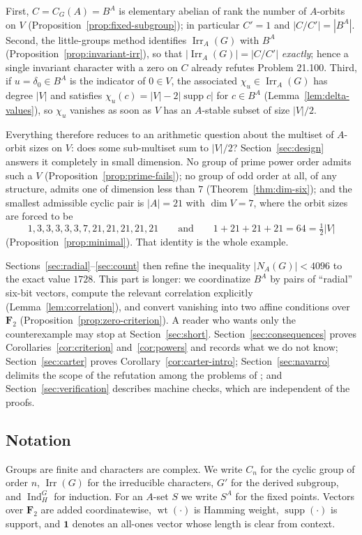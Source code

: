 \documentclass[11pt,a4paper,reqno]{amsart}
\theoremstyle{definition}
\theoremstyle{remark}
\newcommand{\F}{\mathbf F}
\newcommand{\Irr}{\operatorname{Irr}}
\newcommand{\Ind}{\operatorname{Ind}}
\newcommand{\supp}{\operatorname{supp}}
\newcommand{\wt}{\operatorname{wt}}
\newcommand{\one}{\mathbf 1}
\begin{document}
First, $C=C_G(A)=B^A$ is elementary abelian of rank the number of
$A$-orbits on $V$ (Proposition~\ref{prop:fixed-subgroup}); in particular
$C'=1$ and $|C/C'|=|B^A|$.  Second, the little-groups method identifies
$\Irr_A(G)$ with $B^A$ (Proposition~\ref{prop:invariant-irr}), so that
$|\Irr_A(G)|=|C/C'|$ \emph{exactly}; hence a single invariant character
with a zero on $C$ already refutes Problem 21.100.  Third, if
$u=\delta_0\in B^A$ is the indicator of $0\in V$, the associated
$\chi_u\in\Irr_A(G)$ has degree $|V|$ and satisfies
$\chi_u(c)=|V|-2|\supp c|$ for $c\in B^A$
(Lemma~\ref{lem:delta-values}), so $\chi_u$ vanishes as soon as $V$ has
an $A$-stable subset of size $|V|/2$.

Everything therefore reduces to an arithmetic question about the
multiset of $A$-orbit sizes on $V$: does some sub-multiset sum to
$|V|/2$?  Section~\ref{sec:design} answers it completely in small
dimension.  No group of prime power order admits such a $V$
(Proposition~\ref{prop:prime-fails}); no group of odd order at all,
of any structure, admits one of dimension less than $7$
(Theorem~\ref{thm:dim-six}); and the smallest admissible cyclic pair is
$|A|=21$ with $\dim V=7$, where the orbit sizes are forced to be
\[
 1,3,3,3,3,3,7,21,21,21,21,21
 \qquad\text{and}\qquad
 1+21+21+21=64=\tfrac12|V|
\]
(Proposition~\ref{prop:minimal}).  That identity is the whole example.

Sections~\ref{sec:radial}--\ref{sec:count} then refine the inequality
$|N_A(G)|<4096$ to the exact value $1728$.  This part is longer: we
coordinatize $B^A$ by pairs of ``radial'' six-bit vectors, compute the
relevant correlation explicitly (Lemma~\ref{lem:correlation}), and
convert vanishing into two affine conditions over $\F_2$
(Proposition~\ref{prop:zero-criterion}).  A reader who wants only the
counterexample may stop at Section~\ref{sec:short}.
Section~\ref{sec:consequences} proves
Corollaries~\ref{cor:criterion} and~\ref{cor:powers} and records what
we do not know; Section~\ref{sec:carter} proves
Corollary~\ref{cor:carter-intro}; Section~\ref{sec:navarro} delimits
the scope of the refutation among the problems of
\cite{navarro-problems}; and Section~\ref{sec:verification} describes
machine checks, which are independent of the proofs.

\subsection*{Notation}

Groups are finite and characters are complex.  We write $C_n$ for the
cyclic group of order $n$, $\Irr(G)$ for the irreducible characters,
$G'$ for the derived subgroup, and $\Ind_H^G$ for induction.  For an
$A$-set $S$ we write $S^A$ for the fixed points.  Vectors over $\F_2$
are added coordinatewise, $\wt(\cdot)$ is Hamming weight, $\supp(\cdot)$
is support, and $\one$ denotes an all-ones vector whose length is clear
from context.
\end{document}

